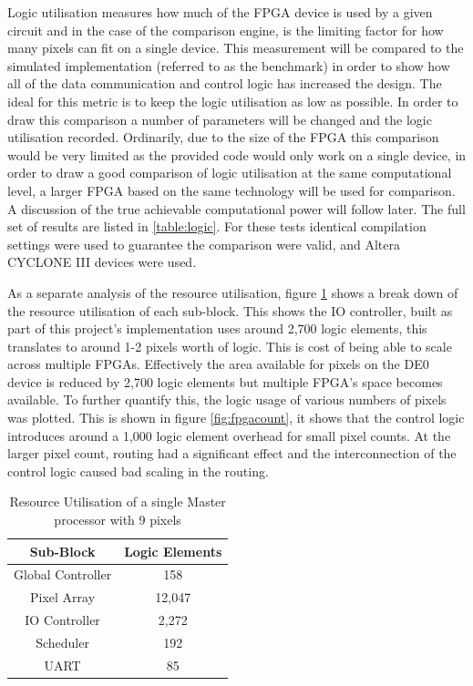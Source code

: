Logic utilisation measures how much of the FPGA device is used by a given circuit and in the case of the comparison engine, is the limiting factor for how many pixels can fit on a single device. This measurement will be compared to the simulated implementation (referred to as the benchmark) in order to show how all of the data communication and control logic has increased the design. The ideal for this metric is to keep the logic utilisation as low as possible. In order to draw this comparison a number of parameters will be changed and the logic utilisation recorded. Ordinarily, due to the size of the FPGA this comparison would be very limited as the provided code would only work on a single device, in order to draw a good comparison of logic utilisation at the same computational level, a larger FPGA based on the same technology will be used for comparison. A discussion of the true achievable computational power will follow later. The full set of results are listed in \ref{table:logic}. For these tests identical compilation settings were used to guarantee the comparison were valid, and Altera CYCLONE III devices were used.

As a separate analysis of the resource utilisation, figure \ref{table:single} shows a break down of the resource utilisation of each sub-block. This shows the IO controller, built as part of this project's implementation uses around 2,700 logic elements, this translates to around 1-2 pixels worth of logic. This is cost of being able to scale across multiple FPGAs. Effectively the area available for pixels on the DE0 device is reduced by 2,700 logic elements but multiple FPGA's space becomes available. To further quantify this, the logic usage of various numbers of pixels was plotted. This is shown in figure \ref{fig:fpgacount}, it shows that the control logic introduces around a 1,000 logic element overhead for small pixel counts. At the larger pixel count, routing had a significant effect and the interconnection of the control logic caused bad scaling in the routing.



\begin{table}[!h]
\centering %
\begin{tabular}{c c} %
\hline %
\hline
Sub-Block & Logic Elements\\  %
\hline
Global Controller & 158 \\
Pixel Array & 12,047 \\
IO Controller & 2,272 \\
Scheduler & 192 \\
UART & 85\\
\hline
\end{tabular}
\caption{Resource Utilisation of a single Master processor with 9 pixels} %
\label{table:single}
\end{table}


